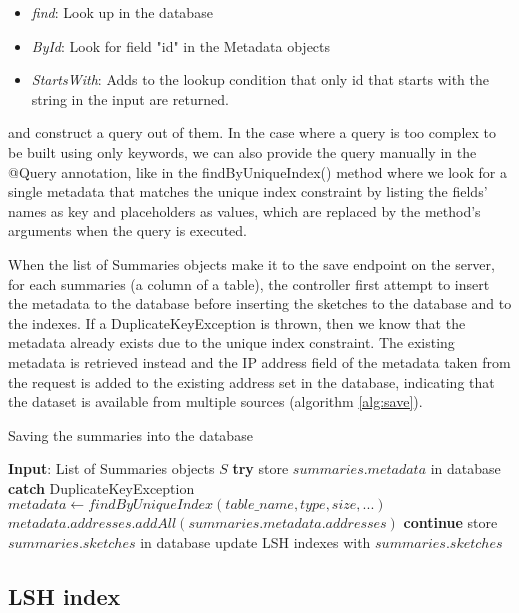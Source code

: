 \begin{itemize}
    \item \textit{find}: Look up in the database
    \item \textit{ById}: Look for field "id" in the Metadata objects
    \item \textit{StartsWith}: Adds to the lookup condition that only id that starts with the string in the input are returned.
\end{itemize}

and construct a query out of them. In the case where a query is too complex to be built using only keywords, we can also provide the query manually in the @Query annotation, like in the findByUniqueIndex() method where we look for a single metadata that matches the unique index constraint by listing the fields' names as key and placeholders as values, which are replaced by the method's arguments when the query is executed.

When the list of Summaries objects make it to the save endpoint on the server, for each summaries (a column of a table), the controller first attempt to insert the metadata to the database before inserting the sketches to the database and to the indexes. If a DuplicateKeyException is thrown, then we know that the metadata already exists due to the unique index constraint. The existing metadata is retrieved instead and the IP address field of the metadata taken from the request is added to the existing address set in the database, indicating that the dataset is available from multiple sources (algorithm \ref{alg:save}).

\begin{algorithm}
    \caption{Saving the summaries into the database}
    \label{alg:save}
    \begin{algorithmic}[1]
\STATE \textbf{Input}: List of Summaries objects $S$
\STATE \textbf{try} 
\STATE \; store $summaries.metadata$ in database
\STATE \textbf{catch} DuplicateKeyException
\STATE \; $metadata \gets findByUniqueIndex(table\_name, type, size,...)$
\STATE \; $metadata.addresses.addAll(summaries.metadata.addresses)$
\STATE \; \textbf{continue}
\STATE store $summaries.sketches$ in database
\STATE update LSH indexes with $summaries.sketches$
\ENDFOR
    \end{algorithmic}
\end{algorithm}

\subsection{LSH index}


